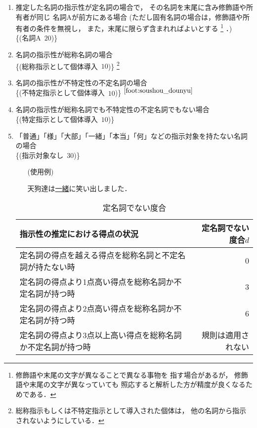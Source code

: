 {\begin{enumerate}
\item 
  \label{enum:定名詞探索}
  推定した名詞の指示性が定名詞の場合で，
  その名詞を末尾に含み修飾語や所有者が同じ
  名詞Aが前方にある場合
  (ただし固有名詞の場合は，修飾語や所有者の条件を無視し，
  また，末尾に限らず含まれればよいとする
  \footnote{
    修飾語や末尾の文字が異なることで異なる事物を
    指す場合があるが，
    修飾語や末尾の文字が異なっていても
    照応すると解析した方が精度が良くなるためである．
    }
  ．) 
  \\ \{(名詞A 
  \,$20$)\}

\item 
  \label{enum:総称名詞導入}
  名詞の指示性が総称名詞の場合\\ 
  \{(総称指示として個体導入 \,$10$)\} 
  \footnote{
    \label{foot:soushou_dounyu}
    総称指示もしくは不特定指示として導入された個体は，
    他の名詞から指示されないようにしている．}


\item 名詞の指示性が不特定性の不定名詞の場合\\ 
  \{(不特定指示として個体導入 \,$10$)\}
  $^{\ref{foot:soushou_dounyu}}$

\item
  名詞の指示性が総称名詞でも不特定性の不定名詞でもない場合\\ 
  \{(特定指示として個体導入 \,$10$)\}

\item 
  「普通」「様」「大部」「一緒」「本当」「何」などの指示対象を持たない名詞の場合\\
  \{(指示対象なし \,$30$)\}

  \begin{itemize}
  \item[(使用例)]

  天狗達は\underline{一緒}に笑い出しました．

  \end{itemize}

  \begin{table}[t]
    \begin{center}
      \leavevmode
    \caption{定名詞でない度合}
    \label{tab:teimeishidenai_doai}
  \begin{tabular}[h]{|l|r|}\hline
  指示性の推定における得点の状況                           & 定名詞でない度合$d$\\\hline
  定名詞の得点を越える得点を総称名詞と不定名詞が持たない時 & 0\\
  定名詞の得点より1点高い得点を総称名詞か不定名詞が持つ時  & $3$\\
  定名詞の得点より2点高い得点を総称名詞か不定名詞が持つ時  & $6$\\
  定名詞の得点より3点以上高い得点を総称名詞か不定名詞が持つ時 &  規則は適用されない \\\hline
  \end{tabular}
    \end{center}
  \end{table}


\end{enumerate}}
